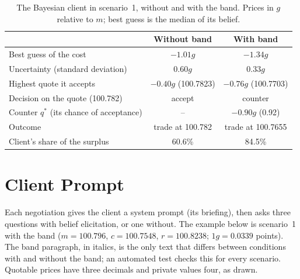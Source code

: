 \documentclass[sigconf]{acmart}
\begin{document}
\begin{table}[ht]
  \small
  \caption{The Bayesian client in scenario~1, without and with the band. Prices in $g$ relative to $m$; best guess is the median of its belief.}
  \label{tab:bayes}
  \begin{tabular}{@{}lcc@{}}
    \toprule
    & Without band & With band \\
    \midrule
    Best guess of the cost & $-1.01g$ & $-1.34g$ \\
    Uncertainty (standard deviation) & $0.60g$ & $0.33g$ \\
    Highest quote it accepts & $-0.40g$ (100.7823) & $-0.76g$ (100.7703) \\
    Decision on the quote (100.782) & accept & counter \\
    Counter $q^*$ (its chance of acceptance) & -- & $-0.90g$ (0.92) \\
    Outcome & trade at 100.782 & trade at 100.7655 \\
    Client's share of the surplus & 60.6\% & 84.5\% \\
    \bottomrule
  \end{tabular}
\end{table}

\section{Client Prompt}
\label{app:prompt}
Each negotiation gives the client a system prompt (its briefing), then asks three questions with belief elicitation, or one without. The example below is scenario~1 with the band ($m = 100.796$, $c = 100.7548$, $r = 100.8238$; $1g = 0.0339$ points). The band paragraph, in italics, is the only text that differs between conditions with and without the band; an automated test checks this for every scenario. Quotable prices have three decimals and private values four, as drawn.
\end{document}
